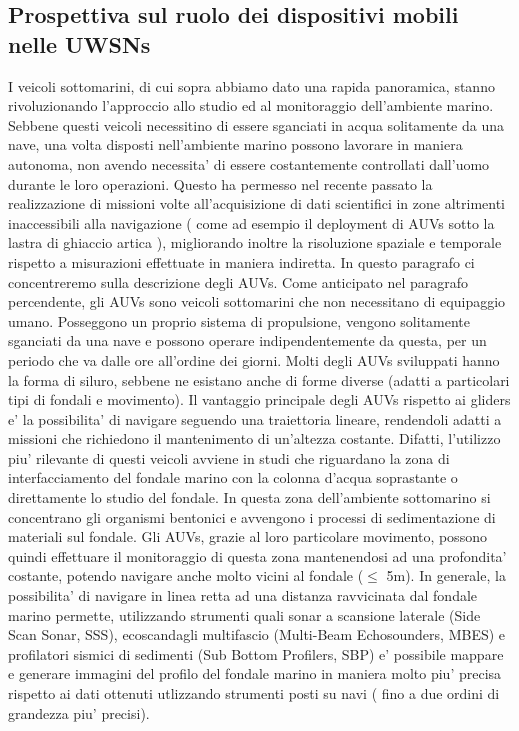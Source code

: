 \subsection{Prospettiva sul ruolo dei dispositivi mobili nelle UWSNs}
I veicoli sottomarini, di cui sopra abbiamo dato una rapida panoramica, stanno rivoluzionando l'approccio allo studio ed al monitoraggio dell'ambiente marino. \newline Sebbene questi veicoli necessitino di essere sganciati in acqua solitamente da una nave, una volta disposti nell'ambiente marino possono lavorare in maniera autonoma, non avendo necessita' di essere costantemente controllati dall'uomo durante le loro operazioni. \newline Questo ha permesso nel recente passato la realizzazione di missioni volte all'acquisizione di dati scientifici in zone altrimenti inaccessibili alla navigazione ( come ad esempio il deployment di AUVs sotto la lastra di ghiaccio artica \cite{wadhams}), migliorando inoltre la risoluzione spaziale e temporale rispetto a misurazioni effettuate in maniera indiretta.\newline
In questo paragrafo ci concentreremo sulla descrizione degli AUVs.
Come anticipato nel paragrafo percendente, gli AUVs sono veicoli sottomarini che non necessitano di equipaggio umano. Posseggono un proprio sistema di propulsione, vengono solitamente sganciati da una nave e possono operare indipendentemente da questa, per un periodo che va dalle ore all'ordine dei giorni. Molti degli AUVs sviluppati hanno la forma di siluro, sebbene ne esistano anche di forme diverse (adatti a particolari tipi di fondali e movimento).\newline
Il vantaggio principale degli AUVs rispetto ai gliders e' la possibilita' di navigare seguendo una traiettoria lineare, rendendoli adatti a missioni che richiedono il mantenimento di un'altezza costante.
Difatti, l'utilizzo piu' rilevante di questi veicoli  avviene in studi che riguardano la zona di interfacciamento del fondale marino con la colonna d'acqua soprastante o direttamente lo studio del fondale.  In questa zona dell'ambiente sottomarino si concentrano gli organismi bentonici e avvengono i processi di sedimentazione di materiali sul fondale. 
Gli AUVs, grazie al loro particolare movimento, possono quindi effettuare il monitoraggio di questa zona mantenendosi ad una profondita' costante, potendo navigare anche molto vicini al fondale ($\leq$ 5m). \newline
In generale, la possibilita' di navigare in linea retta ad una distanza ravvicinata dal fondale marino permette, utilizzando strumenti quali sonar a scansione laterale (Side Scan Sonar, SSS), ecoscandagli multifascio (Multi-Beam Echosounders, MBES) e profilatori sismici di sedimenti (Sub Bottom Profilers, SBP) e' possibile mappare e generare immagini del profilo del fondale marino in maniera molto piu' precisa rispetto ai dati ottenuti utlizzando strumenti posti su navi ( fino a due ordini di grandezza piu' precisi). \newline 
